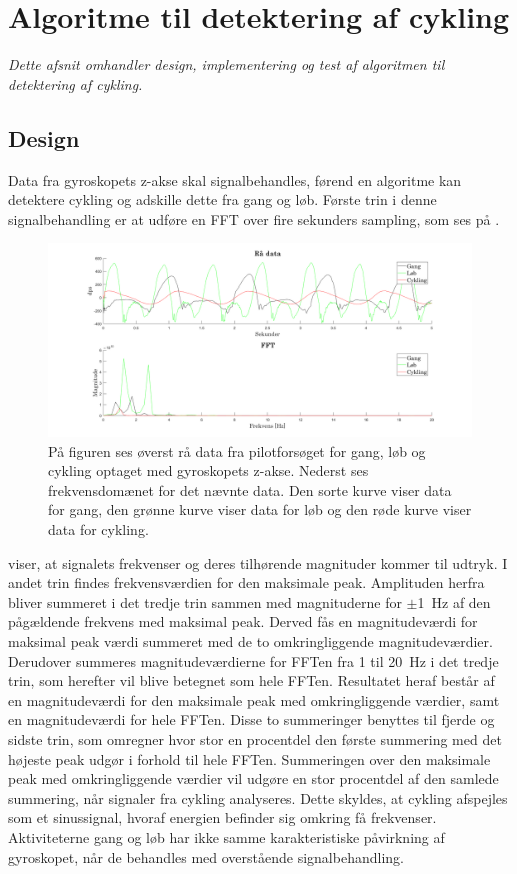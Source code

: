 \section{Algoritme til detektering af cykling}\label{sec:algocykel}
\textit{Dette afsnit omhandler design, implementering og test af algoritmen til detektering af cykling.}  

\subsection{Design}\label{design_cykling}
Data fra gyroskopets z-akse skal signalbehandles, førend en algoritme kan detektere cykling og adskille dette fra gang og løb. Første trin i denne signalbehandling er at udføre en FFT over fire sekunders sampling, som ses på .
\begin{figure}[H]
	\centering
	\includegraphics[scale=0.3]{figures/cDesign/gyro_behandling.png}
	\caption{På figuren ses øverst rå data fra pilotforsøget for gang, løb og cykling optaget med gyroskopets z-akse. Nederst ses frekvensdomænet for det nævnte data. Den sorte kurve viser data for gang, den grønne kurve viser data for løb og den røde kurve viser data for cykling.}
	\label{fig:gyro_behandling}
\end{figure}\vspace{-0.25cm}
 viser, at signalets frekvenser og deres tilhørende magnituder kommer til udtryk. I andet trin findes frekvensværdien for den maksimale peak. Amplituden herfra bliver summeret i det tredje trin sammen med magnituderne for $\pm$1~Hz af den pågældende frekvens med maksimal peak. Derved fås en magnitudeværdi for maksimal peak værdi summeret med de to omkringliggende magnitudeværdier. Derudover summeres magnitudeværdierne for FFTen fra 1 til 20~Hz i det tredje trin, som herefter vil blive betegnet som hele FFTen. Resultatet heraf består af en magnitudeværdi for den maksimale peak med omkringliggende værdier, samt en magnitudeværdi for hele FFTen. Disse to summeringer benyttes til fjerde og sidste trin, som omregner hvor stor en procentdel den første summering med det højeste peak udgør i forhold til hele FFTen. Summeringen over den maksimale peak med omkringliggende værdier vil udgøre en stor procentdel af den samlede summering, når signaler fra cykling analyseres. Dette skyldes, at cykling afspejles som et sinussignal, hvoraf energien befinder sig omkring få frekvenser. Aktiviteterne gang og løb har ikke samme karakteristiske påvirkning af gyroskopet, når de behandles med overstående signalbehandling.

